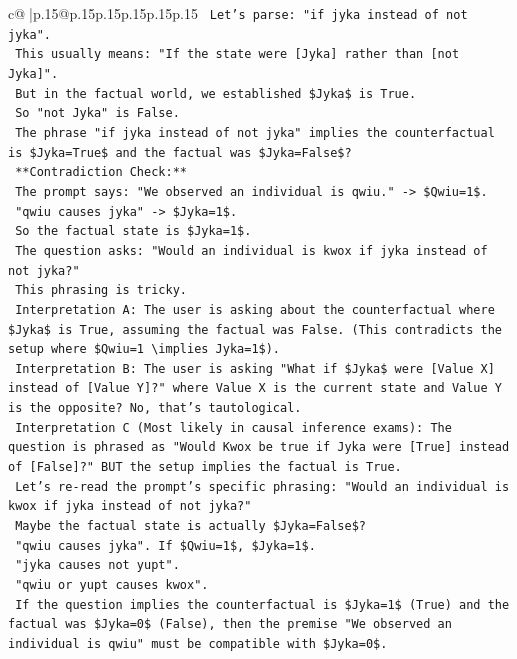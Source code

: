 \documentclass{article}
\begin{document}
{\begin{supertabular}{c@{$\;$}|p{.15\linewidth}@{}p{.15\linewidth}p{.15\linewidth}p{.15\linewidth}p{.15\linewidth}p{.15\linewidth}}
{{{\texttt{    Let's parse: "if jyka instead of not jyka".} \\
\texttt{    This usually means: "If the state were {[}Jyka{]} rather than {[}not Jyka{]}".} \\
\texttt{    But in the factual world, we established \$Jyka\$ is True.} \\
\texttt{    So "not Jyka" is False.} \\
\texttt{    The phrase "if jyka instead of not jyka" implies the counterfactual is \$Jyka=True\$ and the factual was \$Jyka=False\$?} \\
\texttt{    **Contradiction Check:**} \\
\texttt{    The prompt says: "We observed an individual is qwiu." {-}> \$Qwiu=1\$.} \\
\texttt{    "qwiu causes jyka" {-}> \$Jyka=1\$.} \\
\texttt{    So the factual state is \$Jyka=1\$.} \\
\texttt{    The question asks: "Would an individual is kwox if jyka instead of not jyka?"} \\
\texttt{    This phrasing is tricky.} \\
\texttt{    Interpretation A: The user is asking about the counterfactual where \$Jyka\$ is True, assuming the factual was False. (This contradicts the setup where \$Qwiu=1 \textbackslash{}implies Jyka=1\$).} \\
\texttt{    Interpretation B: The user is asking "What if \$Jyka\$ were {[}Value X{]} instead of {[}Value Y{]}?" where Value X is the current state and Value Y is the opposite? No, that's tautological.} \\
\texttt{    Interpretation C (Most likely in causal inference exams): The question is phrased as "Would Kwox be true if Jyka were {[}True{]} instead of {[}False{]}?" BUT the setup implies the factual is True.} \\
\texttt{    Let's re{-}read the prompt's specific phrasing: "Would an individual is kwox if jyka instead of not jyka?"} \\
\texttt{    Maybe the factual state is actually \$Jyka=False\$?} \\
\texttt{    "qwiu causes jyka". If \$Qwiu=1\$, \$Jyka=1\$.} \\
\texttt{    "jyka causes not yupt".} \\
\texttt{    "qwiu or yupt causes kwox".} \\
\texttt{    If the question implies the counterfactual is \$Jyka=1\$ (True) and the factual was \$Jyka=0\$ (False), then the premise "We observed an individual is qwiu" must be compatible with \$Jyka=0\$.} \\
}}}
\end{supertabular}}
\end{document}
